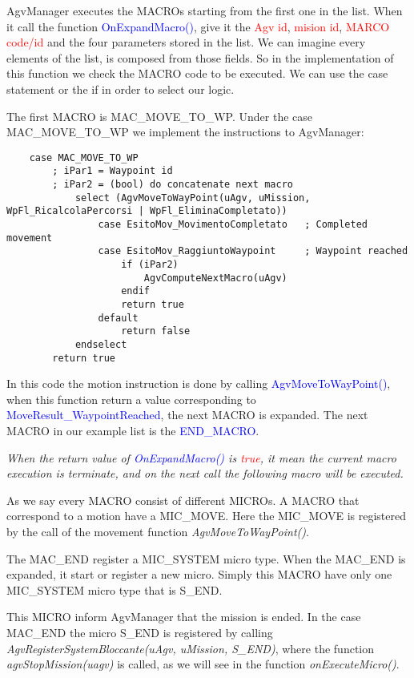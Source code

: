 AgvManager executes the MACROs starting from the first one in the list. When it call the function \textcolor{blue}{OnExpandMacro()}, give it the \textcolor{red}{Agv id}, \textcolor{red}{mision id}, \textcolor{red}{MARCO code/id} and the four parameters stored in the list. We can imagine every elements of the list, is composed from those fields. So in the implementation of this function we check the MACRO code to be executed. We can use the case statement or the if in order to select our logic.

The first MACRO is MAC\_MOVE\_TO\_WP. Under the case MAC\_MOVE\_TO\_WP we implement the instructions to AgvManager:

\begin{lstlisting}
	case MAC_MOVE_TO_WP
		; iPar1 = Waypoint id
		; iPar2 = (bool) do concatenate next macro
			select (AgvMoveToWayPoint(uAgv, uMission, WpFl_RicalcolaPercorsi | WpFl_EliminaCompletato))
				case EsitoMov_MovimentoCompletato	; Completed movement
				case EsitoMov_RaggiuntoWaypoint		; Waypoint reached
					if (iPar2)
						AgvComputeNextMacro(uAgv)
					endif
					return true
				default
					return false
			endselect
		return true
\end{lstlisting}

In this code the motion instruction is done by calling \textcolor{blue}{AgvMoveToWayPoint()}, when this function return a value corresponding to \textcolor{blue}{MoveResult\_WaypointReached}, the next MACRO is expanded. The next MACRO in our example list is the \textcolor{blue}{END\_MACRO}.

\textit{When the return value of \textcolor{blue}{OnExpandMacro()} is \textcolor{red}{true}, it mean the current macro execution is terminate, and on the next call the following macro will be executed.} 

As we say every MACRO consist of different MICROs. A MACRO that correspond to a motion have a MIC\_MOVE. Here the MIC\_MOVE is registered by the call of the movement function \textit{AgvMoveToWayPoint()}.

The MAC\_END register a MIC\_SYSTEM micro type. When the MAC\_END is expanded, it start or register a new micro. Simply this MACRO have only one MIC\_SYSTEM micro type that is S\_END.

This MICRO inform AgvManager that the mission is ended. In the case MAC\_END the micro S\_END is registered by calling \textit{AgvRegisterSystemBloccante(uAgv, uMission, S\_END)}, where the function \textit{agvStopMission(uagv)} is called, as we will see in the function \textit{onExecuteMicro()}.\\

